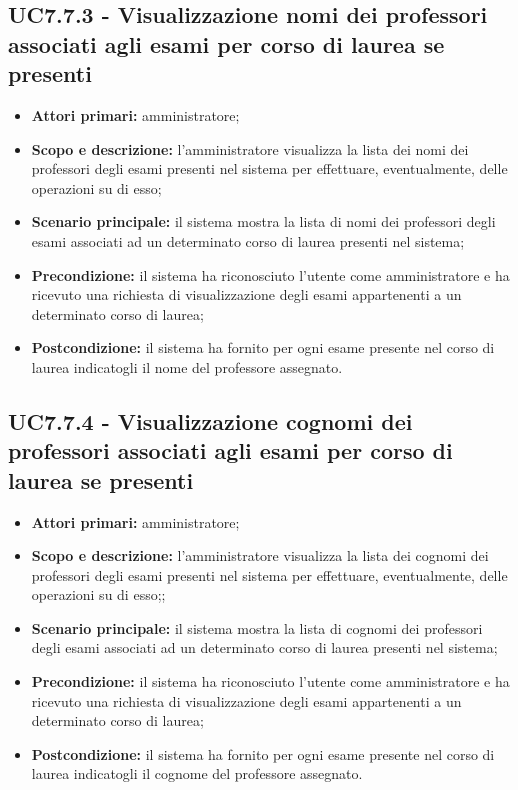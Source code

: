 \documentclass[AnalisiDeiRequisiti.tex]{subfiles}
\begin{document}
\subsection{UC7.7.3 - Visualizzazione nomi dei professori associati agli esami per corso di laurea se presenti}
\begin{itemize}
	\item \textbf{Attori primari:} amministratore;
	\item \textbf{Scopo e descrizione:} l'amministratore visualizza la lista dei nomi dei professori degli esami presenti nel sistema per effettuare, eventualmente, delle operazioni su di esso;
	\item \textbf{Scenario principale:} il sistema mostra la lista di nomi dei professori degli esami associati ad un determinato corso di laurea presenti nel sistema;
	\item \textbf{Precondizione:} il sistema ha riconosciuto l'utente come amministratore e ha ricevuto una richiesta di visualizzazione degli esami appartenenti a un determinato corso di laurea; 
	\item \textbf{Postcondizione:} il sistema ha fornito per ogni esame presente nel corso di laurea indicatogli il nome del professore assegnato.
\end{itemize}
\subsection{UC7.7.4 - Visualizzazione cognomi dei professori associati agli esami per corso di laurea se presenti}
\begin{itemize}
	\item \textbf{Attori primari:} amministratore;
	\item \textbf{Scopo e descrizione:} l'amministratore visualizza la lista dei cognomi dei professori degli esami presenti nel sistema per effettuare, eventualmente, delle operazioni su di esso;;
	\item \textbf{Scenario principale:} il sistema mostra la lista di cognomi dei professori degli esami associati ad un determinato corso di laurea presenti nel sistema;
	\item \textbf{Precondizione:} il sistema ha riconosciuto l'utente come amministratore e ha ricevuto una richiesta di visualizzazione degli esami appartenenti a un determinato corso di laurea; 
	\item \textbf{Postcondizione:} il sistema ha fornito per ogni esame presente nel corso di laurea indicatogli il cognome del professore assegnato.
\end{itemize}
\end{document}
